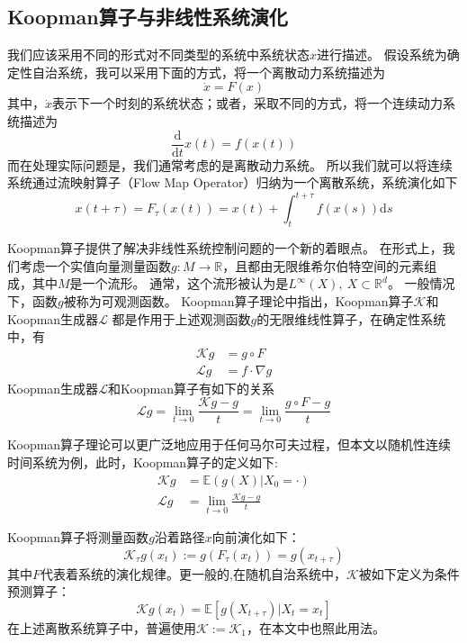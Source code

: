 \documentclass[AutoFakeBold]{LZUThesis}
\begin{document}
\subsection{Koopman算子与非线性系统演化}
我们应该采用不同的形式对不同类型的系统中系统状态$x$进行描述。
假设系统为确定性自治系统，我可以采用下面的方式，将一个离散动力系统描述为
\begin{equation}
  \dot{x} = F(x)
\end{equation}
其中，$\Dot{x}$表示下一个时刻的系统状态；或者，采取不同的方式，将一个连续动力系统描述为
\begin{equation}
  \frac{\mathrm{d}}{\mathrm{d}t} x(t) = f(x(t))
\end{equation}
而在处理实际问题是，我们通常考虑的是离散动力系统。
所以我们就可以将连续系统通过流映射算子（Flow Map Operator）归纳为一个离散系统，系统演化如下
\begin{equation}
  x(t + \tau) = F_\tau(x(t)) = x(t) + \int^{t + \tau}_t f(x(s)) \mathrm{d}s
\end{equation}

Koopman算子提供了解决非线性系统控制问题的一个新的着眼点。
在形式上，我们考虑一个实值向量测量函数$g: M \to \mathbb{R}$，且都由无限维希尔伯特空间的元素组成，其中$M$是一个流形。
通常，这个流形被认为是$L^\infty(X), \ X \subset \mathbb{R}^d$。
一般情况下，函数$g$被称为可观测函数。
Koopman算子理论中指出，Koopman算子$\mathcal{K}$和Koopman生成器$\mathcal{L}$
都是作用于上述观测函数$g$的无限维线性算子，在确定性系统中，有
\begin{subequations}
  \begin{align}
    \mathcal{K}g &= g \circ F \\
    \mathcal{L}g &= f \cdot \nabla g
  \end{align}
\end{subequations}
Koopman生成器$\mathcal{L}$和Koopman算子有如下的关系
\begin{equation}
  \mathcal{L} g = \lim_{t \to 0} \frac{\mathcal{K}g - g}{t} = \lim_{t \to 0} \frac{g \circ F - g}{t}
\end{equation}

Koopman算子理论可以更广泛地应用于任何马尔可夫过程，但本文以随机性连续时间系统为例，此时，Koopman算子的定义如下:
\begin{align*}
  \mathcal{K} g &= \mathbb{E} (g(X) | X_0 = \cdot) \\
  \mathcal{L} g &= \lim_{t \to 0} \frac{\mathcal{K} g - g}{t}
\end{align*}

Koopman算子将测量函数$g$沿着路径$x$向前演化如下：
\begin{equation}
  \mathcal{K}_\tau g(x_t) := g(F_\tau(x_t)) = g(x_{t + \tau})
\end{equation}
其中$F$代表着系统的演化规律。更一般的,在随机自治系统中，$\mathcal{K}$被如下定义为条件预测算子：
\begin{equation}
  \mathcal{K} g(x_t) = \mathbb{E}\left[g(X_{t + \tau}) | X_t = x_t\right]
  \label{Linear_Predictor_K}
\end{equation}
在上述离散系统算子中，普遍使用$\mathcal{K} := \mathcal{K}_1$，在本文中也照此用法。
\end{document}
